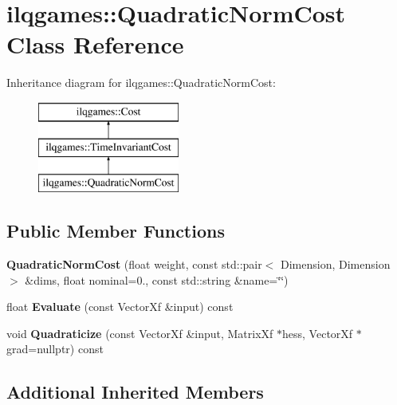 \hypertarget{classilqgames_1_1_quadratic_norm_cost}{}\section{ilqgames\+:\+:Quadratic\+Norm\+Cost Class Reference}
\label{classilqgames_1_1_quadratic_norm_cost}
Inheritance diagram for ilqgames\+:\+:Quadratic\+Norm\+Cost\+:\begin{figure}[H]
\begin{center}
\leavevmode
\includegraphics[height=3.000000cm]{classilqgames_1_1_quadratic_norm_cost}
\end{center}
\end{figure}
\subsection*{Public Member Functions}
\begin{DoxyCompactItemize}
\item 
{\bfseries Quadratic\+Norm\+Cost} (float weight, const std\+::pair$<$ Dimension, Dimension $>$ \&dims, float nominal=0., const std\+::string \&name=\char`\"{}\char`\"{})\hypertarget{classilqgames_1_1_quadratic_norm_cost_a3a8704f72c0d6b4d968bd4e857d53c44}{}\label{classilqgames_1_1_quadratic_norm_cost_a3a8704f72c0d6b4d968bd4e857d53c44}

\item 
float {\bfseries Evaluate} (const Vector\+Xf \&input) const \hypertarget{classilqgames_1_1_quadratic_norm_cost_a627c6954a3c91608f09d54050b0c9a0d}{}\label{classilqgames_1_1_quadratic_norm_cost_a627c6954a3c91608f09d54050b0c9a0d}

\item 
void {\bfseries Quadraticize} (const Vector\+Xf \&input, Matrix\+Xf $\ast$hess, Vector\+Xf $\ast$grad=nullptr) const \hypertarget{classilqgames_1_1_quadratic_norm_cost_a24446f3c0bb3b0f3d328348e044ed95a}{}\label{classilqgames_1_1_quadratic_norm_cost_a24446f3c0bb3b0f3d328348e044ed95a}

\end{DoxyCompactItemize}
\subsection*{Additional Inherited Members}


